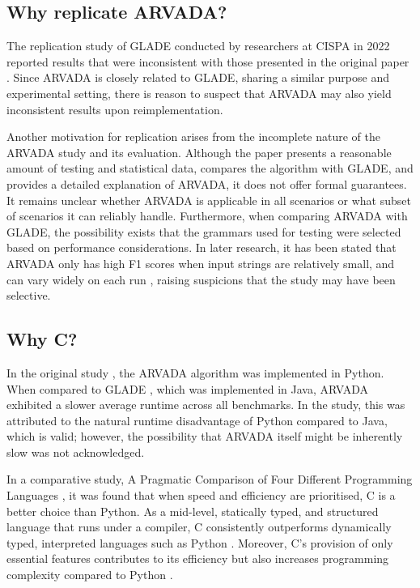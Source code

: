 \subsection{Why replicate ARVADA?}
The replication study of GLADE \cite{bastaniSynthesizingProgramInput} conducted by researchers at CISPA \cite{bendrissouSynthesizingInputGrammars2022} in 2022 reported results that were inconsistent with those presented in the original paper \cite{bastaniSynthesizingProgramInput}. Since ARVADA is closely related to GLADE, sharing a similar purpose and experimental setting, there is reason to suspect that ARVADA may also yield inconsistent results upon reimplementation.

\vspace{\baselineskip}

Another motivation for replication arises from the incomplete nature of the ARVADA study and its evaluation. Although the paper presents a reasonable amount of testing and statistical data, compares the algorithm with GLADE, and provides a detailed explanation of ARVADA, it does not offer formal guarantees. It remains unclear whether ARVADA is applicable in all scenarios or what subset of scenarios it can reliably handle. Furthermore, when comparing ARVADA with GLADE, the possibility exists that the grammars used for testing were selected based on performance considerations. In later research, it has been stated that ARVADA only has high F1 scores when input strings are relatively small, and can vary widely on each run \cite{arefinFastDeterministicBlackbox2024}, raising suspicions that the study may have been selective.

\subsection{Why C?}

In the original study \cite{kulkarniLearningHighlyRecursive2021}, the ARVADA algorithm was implemented in Python. When compared to GLADE \cite{bastaniSynthesizingProgramInput}, which was implemented in Java, ARVADA exhibited a slower average runtime across all benchmarks. In the study, this was attributed to the natural runtime disadvantage of Python compared to Java, which is valid; however, the possibility that ARVADA itself might be inherently slow was not acknowledged.

\vspace{\baselineskip}

In a comparative study, A Pragmatic Comparison of Four Different Programming Languages \cite{aliPragmaticComparisonFour2021}, it was found that when speed and efficiency are prioritised, C is a better choice than Python. As a mid-level, statically typed, and structured language that runs under a compiler, C consistently outperforms dynamically typed, interpreted languages such as Python \cite{kumarPythonLanguageComparison2022}. Moreover, C’s provision of only essential features contributes to its efficiency but also increases programming complexity compared to Python \cite{aliPragmaticComparisonFour2021, kumarPythonLanguageComparison2022}.

